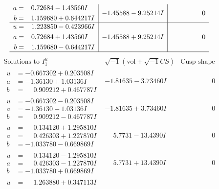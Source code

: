 \documentclass[1p]{elsarticle_modified}
\theoremstyle{definition}
\newcommand{\I}{\sqrt{-1}}
\begin{document}
$$\begin{array}{c|c|c}
\begin{aligned}
a &= \phantom{-}0.72684 - 1.43560 I \\
b &= \phantom{-}1.159680 + 0.644217 I\end{aligned}
 & -1.45588 - 9.25214 I & \phantom{-0.000000 } 0 \\ \hline\begin{aligned}
u &= \phantom{-}1.223850 - 0.423966 I \\
a &= \phantom{-}0.72684 + 1.43560 I \\
b &= \phantom{-}1.159680 - 0.644217 I\end{aligned}
 & -1.45588 + 9.25214 I & \phantom{-0.000000 } 0\\
 \hline 
 \end{array}$$\newpage$$\begin{array}{c|c|c}  
\text{Solutions to }I^u_{1}& \I (\text{vol} + \sqrt{-1}CS) & \text{Cusp shape}\\
 \hline 
\begin{aligned}
u &= -0.667302 + 0.203508 I \\
a &= -1.36130 + 1.03136 I \\
b &= \phantom{-}0.909212 + 0.467787 I\end{aligned}
 & -1.81635 - 3.73460 I & \phantom{-0.000000 } 0 \\ \hline\begin{aligned}
u &= -0.667302 - 0.203508 I \\
a &= -1.36130 - 1.03136 I \\
b &= \phantom{-}0.909212 - 0.467787 I\end{aligned}
 & -1.81635 + 3.73460 I & \phantom{-0.000000 } 0 \\ \hline\begin{aligned}
u &= \phantom{-}0.134120 + 1.295810 I \\
a &= \phantom{-}0.426303 + 1.227870 I \\
b &= -1.033780 - 0.669869 I\end{aligned}
 & \phantom{-}5.7731 - 13.4390 I & \phantom{-0.000000 } 0 \\ \hline\begin{aligned}
u &= \phantom{-}0.134120 - 1.295810 I \\
a &= \phantom{-}0.426303 - 1.227870 I \\
b &= -1.033780 + 0.669869 I\end{aligned}
 & \phantom{-}5.7731 + 13.4390 I & \phantom{-0.000000 } 0 \\ \hline\begin{aligned}
u &= \phantom{-}1.263880 + 0.347113 I \\

\end{aligned}
\end{array}$$
\end{document}
